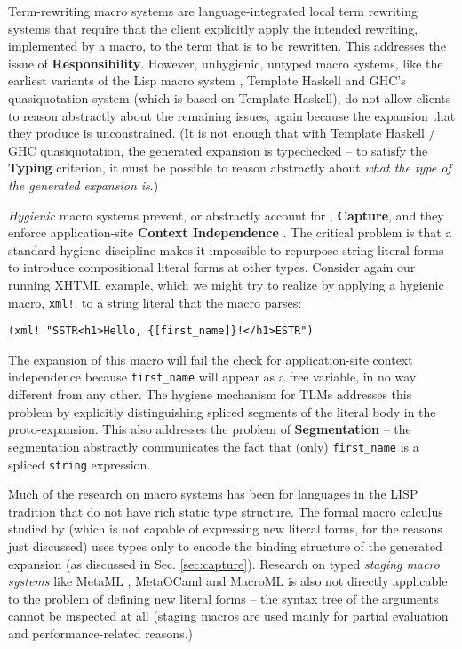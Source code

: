 \documentclass[acmsmall,review,anonymous]{acmart}\settopmatter{printfolios=true,printccs=false,printacmref=false}
\newcommand{\li}[1]{\lstinline[basicstyle=\ttfamily\fontsize{9pt}{1em}\selectfont]{#1}}
\begin{document}
Term-rewriting macro systems are language-integrated local term rewriting systems that require that the client explicitly apply the intended rewriting, implemented by a macro, to the term that is to be rewritten. This addresses the issue of \textbf{Responsibility}. However, unhygienic, untyped macro systems, like the earliest variants of the Lisp macro system \cite{Hart63a}, Template Haskell \cite{SheardPeytonJones:Haskell-02} and GHC's quasiquotation system \cite{mainland2007s} (which is based on Template Haskell), do not allow clients to reason abstractly about the remaining issues, again because the expansion that they produce is unconstrained. (It is not enough that with Template Haskell / GHC quasiquotation, the generated expansion is typechecked -- to satisfy the \textbf{Typing} criterion, it must be possible to reason abstractly about \emph{what the type of the generated expansion is}.)  

\emph{Hygienic} macro systems prevent, or abstractly account for \cite{DBLP:conf/esop/HermanW08,Herman10:Theory}, \textbf{Capture}, and they enforce application-site \textbf{Context Independence} \cite{Kohlbecker86a,DBLP:conf/popl/Adams15,DBLP:conf/popl/ClingerR91,DBLP:journals/lisp/DybvigHB92}. The critical problem is that a standard hygiene discipline makes it impossible to repurpose string literal forms to introduce compositional literal forms at other types. Consider again our running XHTML example, which we might try to realize by applying a hygienic macro, \li{xml!}, to a string literal that the macro parses:
\begin{lstlisting}[numbers=none]
    (xml! "SSTR<h1>Hello, {[first_name]}!</h1>ESTR")
\end{lstlisting}
The expansion of this macro will fail the check for application-site context independence because \li{first_name} will appear as a free variable, in no way different from any other. The hygiene mechanism for TLMs addresses this problem by explicitly distinguishing spliced segments of the literal body in the proto-expansion. This also addresses the problem of \textbf{Segmentation} -- the segmentation abstractly communicates the fact that (only) \li{first_name} is a spliced \li{string} expression.

Much of the research on macro systems has been for languages in the LISP tradition \cite{mccarthy1978history} that do not have rich static type structure. The formal macro calculus studied by \citet{DBLP:conf/esop/HermanW08} (which is not capable of expressing new literal forms, for the reasons just discussed) uses types only to encode the binding structure of the generated expansion (as discussed in Sec. \ref{sec:capture}). Research on typed \emph{staging macro systems} like MetaML \cite{Sheard:1999:UMS}, MetaOCaml \cite{DBLP:conf/flops/Kiselyov14} and MacroML \cite{ganz2001macros} is also not directly applicable to the problem of defining new literal forms -- the syntax tree of the arguments cannot be inspected at all (staging macros are used mainly for partial evaluation and performance-related reasons.) 
\end{document}
